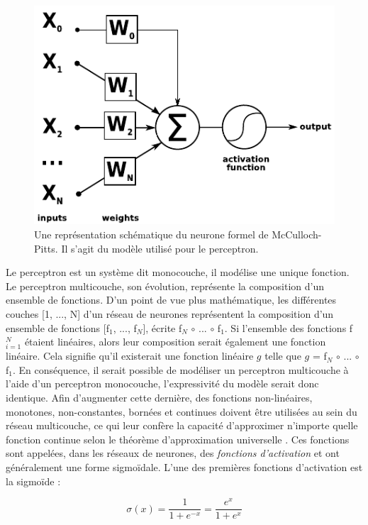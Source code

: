 \documentclass[12pt,a4paper,times,twoside,openright]{report}
\begin{document}
\begin{figure}[ht!]
\centering
\includegraphics[scale=1.0]{images/NN/McCulloch-Pitts-neuron}
\caption{Une représentation schématique du neurone formel de McCulloch-Pitts. Il s'agit du modèle utilisé pour le perceptron.}
\label{fig:mcculloch-pitts-neuron}
\end{figure}

Le perceptron est un système dit monocouche, il modélise une unique fonction. Le perceptron multicouche, son évolution, représente la composition d'un ensemble de fonctions. D'un point de vue plus mathématique, les différentes couches [1, ..., N] d'un réseau de neurones représentent la composition d'un ensemble de fonctions [f$_{1}$, ..., f$_{N}$], écrite f$_{N}$ $\circ$ ... $\circ$ f$_{1}$. Si l'ensemble des fonctions f$^{N}_{i=1}$ étaient linéaires, alors leur composition serait également une fonction linéaire. Cela signifie qu'il existerait une fonction linéaire $g$ telle que $g$ = f$_{N}$ $\circ$ ... $\circ$ f$_{1}$. En conséquence, il serait possible de modéliser un perceptron multicouche à l'aide d'un perceptron monocouche, l'expressivité du modèle serait donc identique. Afin d'augmenter cette dernière, des fonctions non-linéaires, monotones, non-constantes, bornées et continues doivent être utilisées au sein du réseau multicouche, ce qui leur confère la capacité d'approximer n'importe quelle fonction continue selon le théorème d'approximation universelle \citet{cybenko1989approximation,hornik1991approximation}. Ces fonctions sont appelées, dans les réseaux de neurones, des \emph{fonctions d'activation} et ont généralement une forme sigmoïdale. L'une des premières fonctions d'activation est la sigmoïde :

\begin{equation}\label{eq:sigmoid}
\sigma(x) = \frac{1}{1 + e^{-x}} = \frac{e^{x}}{1 + e^{x}}
\end{equation}
\end{document}
